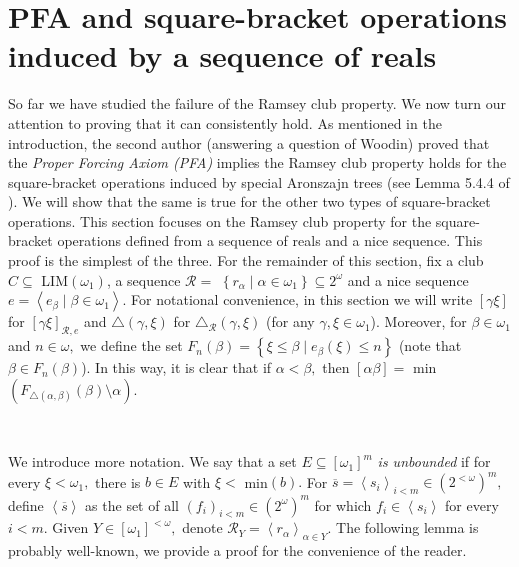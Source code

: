 \documentclass{article}
\begin{document}
\section{PFA and square-bracket operations induced by a sequence of reals
\label{Seccion PFA reals}}

So far we have studied the failure of the Ramsey club property. We now turn
our attention to proving that it can consistently hold. As mentioned in the
introduction, the second author (answering a question of Woodin) proved that
the \emph{Proper Forcing Axiom (\textsf{PFA}) } implies the Ramsey club
property holds for the square-bracket operations induced by special Aronszajn
trees (see Lemma 5.4.4 of \cite{Walks}). We will show that the same is true
for the other two types of square-bracket operations. This section focuses on
the Ramsey club property for the square-bracket operations defined from a
sequence of reals and a nice sequence. This proof is the simplest of the
three. For the remainder of this section, fix a club $C\subseteq$
\textsf{LIM}$\left(  \omega_{1}\right)  $, a sequence $\mathcal{R=}$ $\left\{
r_{\alpha}\mid\alpha\in\omega_{1}\right\}  \subseteq2^{\omega}$ and a nice
sequence $e=\left\langle e_{\beta}\mid\beta\in\omega_{1}\right\rangle .$ For
notational convenience, in this section we will write $\left[  \gamma
\xi\right]  $ for $\left[  \gamma\xi\right]  _{\mathcal{R},e}$ and
$\triangle\left(  \gamma,\xi\right)  $ for $\triangle_{\mathcal{R}}\left(
\gamma,\xi\right)  $ (for any $\gamma,\xi\in\omega_{1}$). Moreover, for
$\beta\in\omega_{1}$ and $n\in\omega,$ we define the set $F_{n}\left(
\beta\right)  =\left\{  \xi\leq\beta\mid e_{\beta}\left(  \xi\right)  \leq
n\right\}  $ (note that $\beta\in F_{n}\left(  \beta\right)  $). In this way,
it is clear that if $\alpha<\beta,$ then $\left[  \alpha\beta\right]  =$
\textsf{min}$\left(  F_{\triangle\left(  \alpha,\beta\right)  }\left(
\beta\right)  \setminus\alpha\right)  .$

\qquad\qquad\qquad\qquad\qquad\ \qquad\ \ \ \qquad\ \ \ 

We introduce more notation. We say that a set $E\subseteq\left[  \omega
_{1}\right]  ^{m}$ \emph{is unbounded }if for every $\xi<\omega_{1},$ there is
$b\in E$ with $\xi<$ \textsf{min}$\left(  b\right)  .$ For $\overline
{s}=\left\langle s_{i}\right\rangle _{i<m}\in\left(  2^{<\omega}\right)
^{m},$ define $\left\langle \overline{s}\right\rangle $ as the set of all
$\left(  f_{i}\right)  _{i<m}\in\left(  2^{\omega}\right)  ^{m}$ for which
$f_{i}\in\left\langle s_{i}\right\rangle $ for every $i<m.$ Given $Y\in\left[
\omega_{1}\right]  ^{<\omega},$ denote $\mathcal{R}_{Y}=\left\langle
r_{\alpha}\right\rangle _{\alpha\in Y}.$ The following lemma is probably
well-known, we provide a proof for the convenience of the reader.
\end{document}
